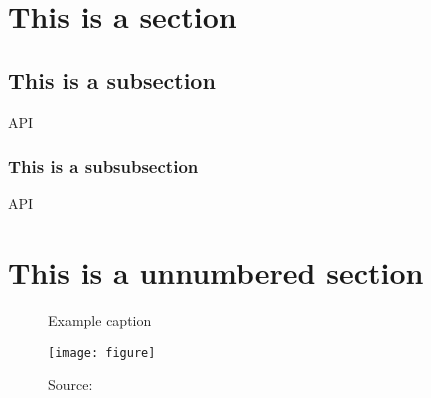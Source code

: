 
\section{This is a section}
\blindtext {}
\subsection{This is a subsection}
\blindtext \ac{API}
\subsubsection{This is a subsubsection}
\blindtext \ac{API}
\section*{This is a unnumbered section}
\begin{figure}[ht] 
    \centering
    \caption{Example caption}
    \texttt{[image: figure]} 
    \caption*{\footnotesize{Source: }}
    \label{fig:goodreference}
    \end{figure}
\blindtext